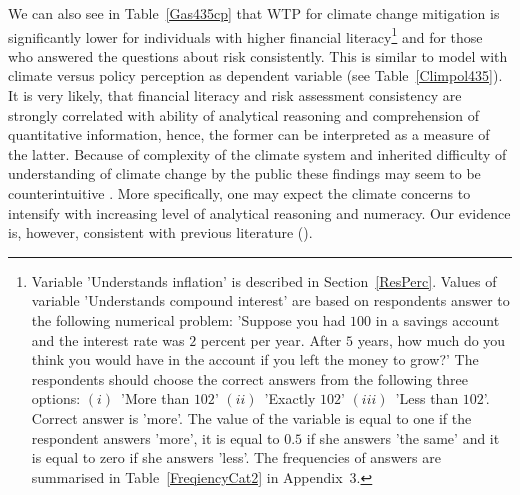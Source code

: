 \documentclass[a4paper,12pt]{article}
\begin{document}
We can also see in Table~\ref{Gas435cp} that WTP for climate change mitigation is significantly lower for individuals with higher financial literacy\footnote{Variable 'Understands inflation' is described in Section~\ref{ResPerc}. Values of variable 'Understands compound interest' are based on respondents answer to the following numerical problem: 'Suppose you had \textsterling $100$ in a savings account and the interest rate was $2$ percent per year.
After $5$ years, how much do you think you would have in the account if you left the money to grow?' The respondents should choose the correct answers from the following three options: $(i)$~'More than \textsterling $102$' $(ii)$~'Exactly \textsterling $102$' $(iii)$~'Less than  \textsterling $102$'. Correct answer is 'more'. The value of the variable is equal to one if the respondent answers 'more', it is equal to $0.5$ if she answers 'the same' and it is equal to zero if she answers 'less'. The frequencies of answers are summarised in Table~\ref{FreqiencyCat2} in Appendix~$3$.} and for those who answered the questions about risk consistently. This is similar to model with climate versus policy perception as dependent variable (see Table~\ref{Climpol435}). It is very likely, that financial literacy and risk assessment consistency are strongly correlated with ability of analytical reasoning and comprehension of quantitative information, hence, the former can be interpreted as a measure of the latter. Because of complexity of the climate system and inherited difficulty of understanding of climate change by the public these findings may seem to be counterintuitive \citep{Weber2011}. More specifically, one may expect the climate concerns to intensify with increasing level of analytical reasoning and numeracy. Our evidence is, however, consistent with previous literature (\citealp{KahanEtAl2012, Kahan2015, Kellstedt2008}).
\end{document}
